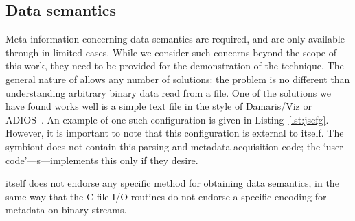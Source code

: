 \subsection{Data semantics}

Meta-information concerning data semantics are required, and are
only available through \freeprocessing{} in limited cases.  While we
consider such concerns beyond the scope of this work, they need to be
provided for the demonstration of the technique.  The general nature of
\freeprocessing{} allows any number of solutions: the problem is no
different than understanding arbitrary binary data read from a file.
One of the solutions we have found works well is a simple text file
in the style of Damaris/Viz or ADIOS~\cite{Dorier:2013:Damaris,
Lofstead:2008:ADIOS}.  An example of one such configuration
is given in Listing~\ref{lst:jscfg}.  However, it is important to
note that this configuration is external to \freeprocessing{}
itself.  The symbiont does not contain this parsing and metadata
acquisition code; the `user
code'---\freeprocessor{}s---implements this only if they desire.


\begin{minipage}{\linewidth}

\vspace{-0.01em}
\end{minipage}

\freeprocessing{} itself does not endorse any specific method for
obtaining data semantics, in the same way that the C file I/O routines
do not endorse a specific encoding for metadata on binary streams.


